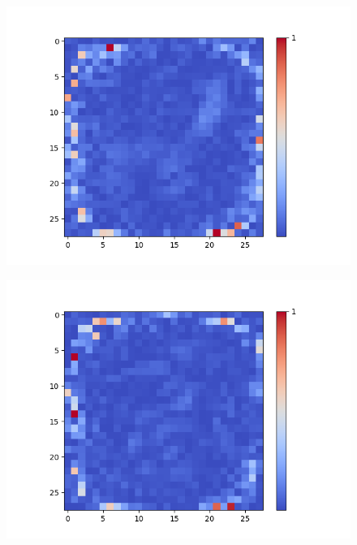 \begin{figure}[H]
\begin{minipage}[b]{0.19\textwidth}
		\includegraphics[width=\textwidth]{Linear-AE/Feature-11.png}
		\label{}
	\end{minipage}
	\begin{minipage}[b]{0.19\textwidth}
		\captionsetup{labelformat=empty}
		\includegraphics[width=\textwidth]{Linear-AE/Feature-15.png}
		\label{}
	\end{minipage}
	\begin{minipage}[b]{0.19\textwidth}
		\captionsetup{labelformat=empty}

\end{minipage}
\end{figure}
